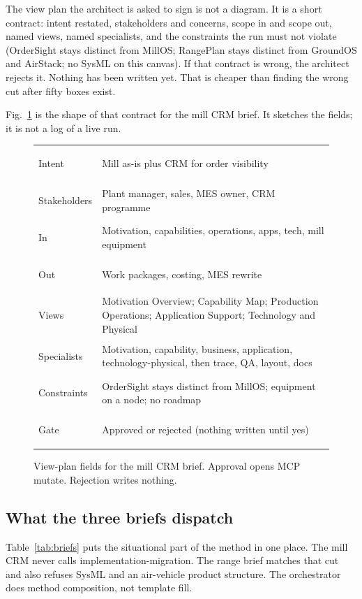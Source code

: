 \documentclass[10pt,journal,compsoc]{IEEEtran}
\begin{document}
The view plan the architect is asked to sign is not a diagram. It is a short contract: intent restated, stakeholders and concerns, scope in and scope out, named views, named specialists, and the constraints the run must not violate (OrderSight stays distinct from MillOS; RangePlan stays distinct from GroundOS and AirStack; no SysML on this canvas). If that contract is wrong, the architect rejects it. Nothing has been written yet. That is cheaper than finding the wrong cut after fifty boxes exist.

Fig.~\ref{fig:plan} is the shape of that contract for the mill CRM brief. It sketches the fields; it is not a log of a live run.

\begin{figure}[!t]
\centering
{\small
\begin{tabularx}{\columnwidth}{@{}>{\bfseries\raggedright\arraybackslash}p{} >{\raggedright\arraybackslash}X@{}}
\toprule
Intent & Mill as-is plus CRM for order visibility \\
Stakeholders & Plant manager, sales, MES owner, CRM programme \\
In & Motivation, capabilities, operations, apps, tech, mill equipment \\
Out & Work packages, costing, MES rewrite \\
Views & Motivation Overview; Capability Map; Production Operations; Application Support; Technology and Physical \\
Specialists & Motivation, capability, business, application, technology-physical, then trace, QA, layout, docs \\
Constraints & OrderSight stays distinct from MillOS; equipment on a node; no roadmap \\
Gate & Approved or rejected (nothing written until yes) \\
\bottomrule
\end{tabularx}}
\caption{View-plan fields for the mill CRM brief. Approval opens MCP mutate. Rejection writes nothing.}
\label{fig:plan}
\end{figure}

\subsection{What the three briefs dispatch}

Table~\ref{tab:briefs} puts the situational part of the method in one place. The mill CRM never calls implementation-migration. The range brief matches that cut and also refuses SysML and an air-vehicle product structure. The orchestrator does method composition, not template fill.
\end{document}
